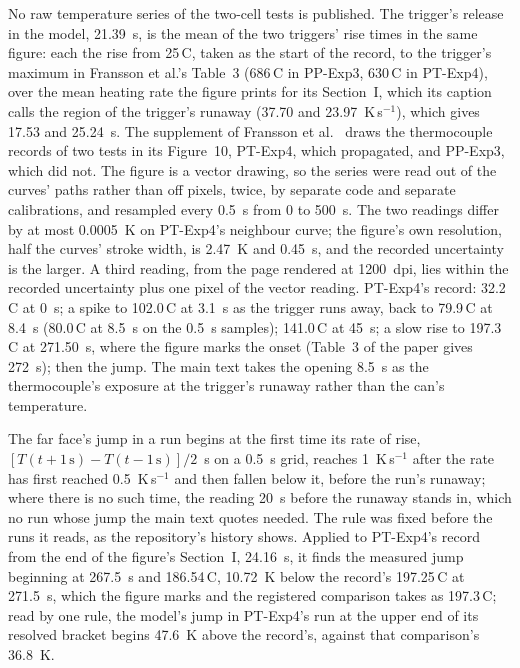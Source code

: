 \documentclass[preprint,12pt]{elsarticle}
\newcommand{\degC}{\,\textdegree C}
\begin{document}
No raw temperature series of the two-cell tests is published. The trigger's release in the model, 21.39~s, is the mean of the two triggers' rise times in the same figure: each the rise from 25\degC, taken as the start of the record, to the trigger's maximum in Fransson et al.'s Table~3 (686\degC{} in PP-Exp3, 630\degC{} in PT-Exp4), over the mean heating rate the figure prints for its Section~I, which its caption calls the region of the trigger's runaway (37.70 and 23.97~K\,s$^{-1}$), which gives 17.53 and 25.24~s. The supplement of Fransson et al.~\cite{fransson2024exploring} draws the thermocouple records of two tests in its Figure~10, PT-Exp4, which propagated, and PP-Exp3, which did not. The figure is a vector drawing, so the series were read out of the curves' paths rather than off pixels, twice, by separate code and separate calibrations, and resampled every 0.5~s from 0 to 500~s. The two readings differ by at most 0.0005~K on PT-Exp4's neighbour curve; the figure's own resolution, half the curves' stroke width, is 2.47~K and 0.45~s, and the recorded uncertainty is the larger. A third reading, from the page rendered at 1200~dpi, lies within the recorded uncertainty plus one pixel of the vector reading. PT-Exp4's record: 32.2\degC{} at 0~s; a spike to 102.0\degC{} at 3.1~s as the trigger runs away, back to 79.9\degC{} at 8.4~s (80.0\degC{} at 8.5~s on the 0.5~s samples); 141.0\degC{} at 45~s; a slow rise to 197.3\degC{} at 271.50~s, where the figure marks the onset (Table~3 of the paper gives 272~s); then the jump. The main text takes the opening 8.5~s as the thermocouple's exposure at the trigger's runaway rather than the can's temperature.

The far face's jump in a run begins at the first time its rate of rise, $[T(t+1\,\mathrm{s})-T(t-1\,\mathrm{s})]/2$~s on a 0.5~s grid, reaches 1~K\,s$^{-1}$ after the rate has first reached 0.5~K\,s$^{-1}$ and then fallen below it, before the run's runaway; where there is no such time, the reading 20~s before the runaway stands in, which no run whose jump the main text quotes needed. The rule was fixed before the runs it reads, as the repository's history shows. Applied to PT-Exp4's record from the end of the figure's Section~I, 24.16~s, it finds the measured jump beginning at 267.5~s and 186.54\degC, 10.72~K below the record's 197.25\degC{} at 271.5~s, which the figure marks and the registered comparison takes as 197.3\degC; read by one rule, the model's jump in PT-Exp4's run at the upper end of its resolved bracket begins 47.6~K above the record's, against that comparison's 36.8~K.
\end{document}
